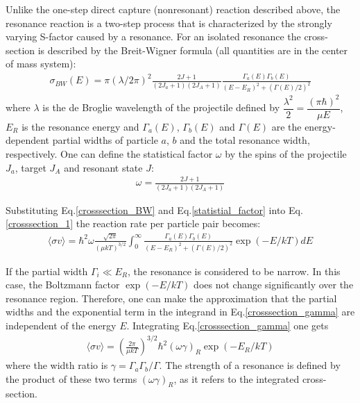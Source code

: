 Unlike the one-step direct capture (nonresonant) reaction described above, the resonance reaction is a two-step process that is characterized by the strongly varying S-factor caused by a resonance. For an isolated resonance the cross-section is described by the Breit-Wigner formula (all quantities are in the center of mass system):
\begin{equation}
    \label{crosssection_BW}
    \begin{aligned}
        \sigma_{BW}(E) = \pi (\lambda/2\pi)^2 \frac{2J+1}{(2J_a+1)(2J_A+1)} \frac{\Gamma_a(E) \Gamma_b(E)}{(E-E_R)^2+(\Gamma(E)/2)^2}
    \end{aligned}
\end{equation}
where $\lambda$ is the de Broglie wavelength of the projectile defined by $\dfrac{\lambda^2}{2}=\dfrac{(\pi \hbar)^2}{\mu E}$, $E_R$ is the resonance energy and   $\Gamma_a(E)$, $\Gamma_b(E)$ and $\Gamma(E)$ are the energy-dependent partial widths of particle $a$, $b$ and the total resonance width, respectively. One can define the statistical factor  $\omega$ by the spins of the projectile $J_a$, target $J_A$ and resonant state $J$:
\begin{equation}
    \label{statistial_factor}
    \begin{aligned}
        \omega = \frac{2J+1}{(2J_a+1)(2J_A+1)}
    \end{aligned}
\end{equation}

Substituting Eq.\ref{crosssection_BW} and Eq.\ref{statistial_factor} into Eq.\ref{crosssection_1} the reaction rate per particle pair becomes:
\begin{equation}
    \label{crosssection_gamma}
    \begin{aligned}
        \langle \sigma v \rangle = \hbar^2 \omega \frac{\sqrt{2\pi}}{(\mu kT)^{3/2}} \int_0^\infty \frac{\Gamma_a(E) \Gamma_b(E)}{(E-E_R)^2 + (\Gamma(E)/2)^2} \exp(-E/kT)dE
    \end{aligned}
\end{equation}


If the partial width $\Gamma_i \ll E_R$, the resonance is considered to be narrow. In this case, the  Boltzmann factor $\exp(-E/kT)$ does not change significantly over the resonance region. Therefore, one can make the approximation that the partial widths and the exponential term in the integrand in Eq.\ref{crosssection_gamma} are independent of the energy $E$. Integrating Eq.\ref{crosssection_gamma} one gets
\begin{equation}
    \label{crosssection_width}
    \begin{aligned}
        \langle \sigma v \rangle = (\frac{2 \pi}{\mu k T})^{3/2} \hbar^2 (\omega \gamma)_R \exp(-E_R/kT)
    \end{aligned}
\end{equation}
where the width ratio is $\gamma = \Gamma_a\Gamma_b/\Gamma$. The strength of a resonance is defined by the product of these two terms $(\omega \gamma)_R$, as it refers to the integrated cross-section.


